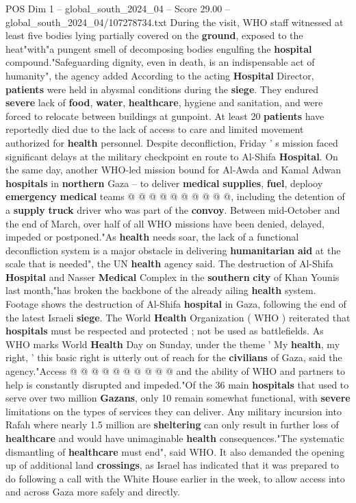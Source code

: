 \begin{textsample}{POS Dim 1 – global\_south\_2024\_04 – Score 29.00 – global\_south\_2024\_04/107278734.txt}
During the visit, WHO staff witnessed at least five bodies lying partially covered on the \textbf{ground}, exposed to the heat"with"a pungent smell of decomposing bodies engulfing the \textbf{hospital} compound."Safeguarding dignity, even in death, is an indispensable act of humanity", the agency added According to the acting \textbf{Hospital} Director, \textbf{patients} were held in abysmal conditions during the \textbf{siege}.
They endured \textbf{severe} lack of \textbf{food}, \textbf{water}, \textbf{healthcare}, hygiene and sanitation, and were forced to relocate between buildings at gunpoint.
At least 20 \textbf{patients} have reportedly died due to the lack of access to care and limited movement authorized for \textbf{health} personnel.
Despite deconfliction, Friday ' s mission faced significant delays at the military checkpoint en route to Al-Shifa \textbf{Hospital}.
On the same day, another WHO-led mission bound for Al-Awda and Kamal Adwan \textbf{hospitals} in \textbf{northern} Gaza -- to deliver \textbf{medical} \textbf{supplies}, \textbf{fuel}, deplooy \textbf{emergency} \textbf{medical} teams @ @ @ @ @ @ @ @ @ @, including the detention of a \textbf{supply} \textbf{truck} driver who was part of the \textbf{convoy}.
Between mid-October and the end of March, over half of all WHO missions have been denied, delayed, impeded or postponed."As \textbf{health} needs soar, the lack of a functional deconfliction system is a major obstacle in delivering \textbf{humanitarian} \textbf{aid} at the scale that is needed", the UN \textbf{health} agency said.
The destruction of Al-Shifa \textbf{Hospital} and Nasser \textbf{Medical} Complex in the \textbf{southern} \textbf{city} of Khan Younis last month,"has broken the backbone of the already ailing \textbf{health} system.
Footage shows the destruction of Al-Shifa \textbf{hospital} in Gaza, following the end of the latest Israeli \textbf{siege}.
The World \textbf{Health} Organization ( WHO ) reiterated that \textbf{hospitals} must be respected and protected ; not be used as battlefields.
As WHO marks World \textbf{Health} Day on Sunday, under the theme ' My \textbf{health}, my right, ' this basic right is utterly out of reach for the \textbf{civilians} of Gaza, said the agency."Access @ @ @ @ @ @ @ @ @ @ and the ability of WHO and partners to help is constantly disrupted and impeded."Of the 36 main \textbf{hospitals} that used to serve over two million \textbf{Gazans}, only 10 remain somewhat functional, with \textbf{severe} limitations on the types of services they can deliver.
Any military incursion into Rafah where nearly 1.5 million are \textbf{sheltering} can only result in further loss of \textbf{healthcare} and would have unimaginable \textbf{health} consequences."The systematic dismantling of \textbf{healthcare} must end", said WHO.
It also demanded the opening up of additional land \textbf{crossings}, as Israel has indicated that it was prepared to do following a call with the White House earlier in the week, to allow access into and across Gaza more safely and directly.


\end{textsample}
